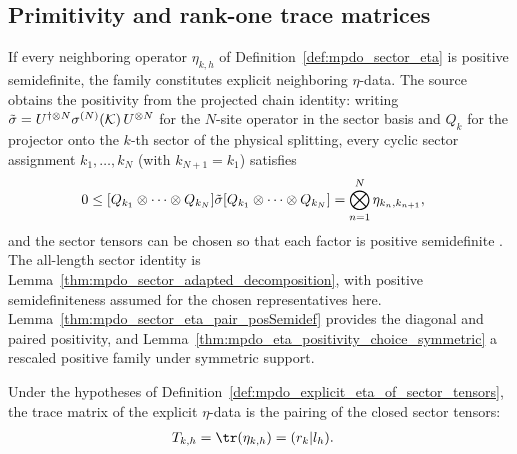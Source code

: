 \subsection{Primitivity and rank-one trace matrices}

\begin{definition}%
    \label{def:mpdo_explicit_eta_of_sector_tensors}
    \leanok
    If every neighboring operator $\eta_{k,h}$ of
    Definition~\ref{def:mpdo_sector_eta} is positive semidefinite, the
    family constitutes explicit neighboring $\eta$-data. The source obtains
    the positivity from the projected chain identity: writing
    $\tilde\sigma
        = U^{\dagger\otimes N} \sigma^{(N)}({\cal K})\,U^{\otimes N}$
    for the $N$-site operator in the sector basis and $Q_k$ for the
    projector onto the $k$-th sector of the physical splitting, every
    cyclic sector assignment $k_1,\ldots,k_N$ (with $k_{N+1}=k_1$) satisfies
    \begin{align}
        0
         & \leq
        [Q_{k_1}\otimes\cdots\otimes Q_{k_N}]
        \tilde\sigma
        [Q_{k_1}\otimes\cdots\otimes Q_{k_N}]
        =\bigotimes_{n=1}^{N}\eta_{k_n,k_{n+1}},
        \notag
    \end{align}
    and the sector tensors can be chosen so that each factor is positive
    semidefinite \cite[Appendix~C.2, lines~1446--1450]{Cirac2016MPDO_arXiv}.
    The all-length sector identity is
    Lemma~\ref{thm:mpdo_sector_adapted_decomposition}, with positive
    semidefiniteness assumed for the chosen representatives here.
    Lemma~\ref{thm:mpdo_sector_eta_pair_posSemidef} provides the diagonal
    and paired positivity, and
    Lemma~\ref{thm:mpdo_eta_positivity_choice_symmetric} a rescaled
    positive family under symmetric support.
\end{definition}

\begin{lemma}
    \label{thm:mpdo_sector_eta_data_trace_matrix}
    \leanok
    Under the hypotheses of
    Definition~\ref{def:mpdo_explicit_eta_of_sector_tensors}, the trace
    matrix of the explicit $\eta$-data is the pairing of the closed sector
    tensors:
    \begin{align}
        T_{k,h}
         & =\tr(\eta_{k,h})=(r_k|l_h).
        \notag
    \end{align}
\end{lemma}

